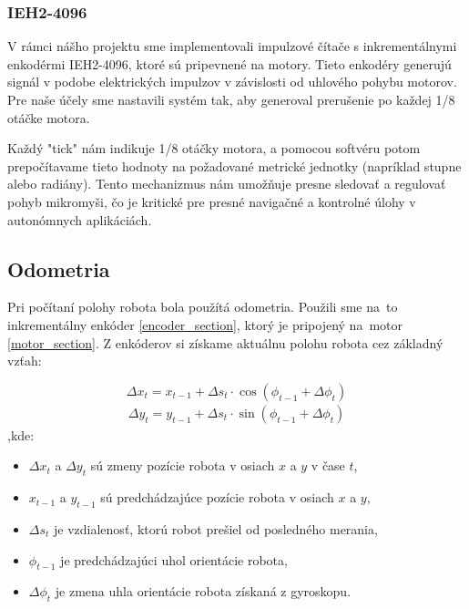 \subsubsection{IEH2-4096}
V rámci nášho projektu sme implementovali impulzové čítače s inkrementálnymi enkodérmi IEH2-4096, ktoré sú pripevnené na motory. Tieto enkodéry generujú signál v podobe elektrických impulzov v závislosti od uhlového pohybu motorov. Pre naše účely sme nastavili systém tak, aby generoval prerušenie po každej 1/8 otáčke motora.

Každý "tick" nám indikuje 1/8 otáčky motora, a pomocou softvéru potom prepočítavame tieto hodnoty na požadované metrické jednotky (napríklad stupne alebo radiány). Tento mechanizmus nám umožňuje presne sledovať a regulovať pohyb mikromyši, čo je kritické pre presné navigačné a kontrolné úlohy v autonómnych aplikáciách.
\newpage
\subsection{Odometria}
\label{subsec:odometria}

Pri počítaní polohy robota bola použítá odometria.
Použili sme na~to inkrementálny enkóder \ref{encoder_section}, ktorý je pripojený na~motor \ref{motor_section}. Z enkóderov si získame aktuálnu polohu robota
cez základný vzťah:

\begin{equation}
	\label{eq:odometria}
	 \Delta x_t = x_{t-1} + \Delta s_t \cdot \cos(\phi_{t-1} + \Delta \phi_t)
\end{equation}
\begin{align}
	\Delta y_t = y_{t-1} + \Delta s_t \cdot \sin(\phi_{t-1} + \Delta \phi_t)
\end{align}
,kde:
\begin{itemize}
    \item $\Delta x_t$ a $\Delta y_t$ sú zmeny pozície robota v osiach $x$ a $y$ v čase $t$,
    \item $x_{t-1}$ a $y_{t-1}$ sú predchádzajúce pozície robota v osiach $x$ a $y$,
    \item $\Delta s_t$ je vzdialenosť, ktorú robot prešiel od posledného merania,
    \item $\phi_{t-1}$ je predchádzajúci uhol orientácie robota,
    \item $\Delta \phi_t$ je zmena uhla orientácie robota získaná z gyroskopu.
\end{itemize}

